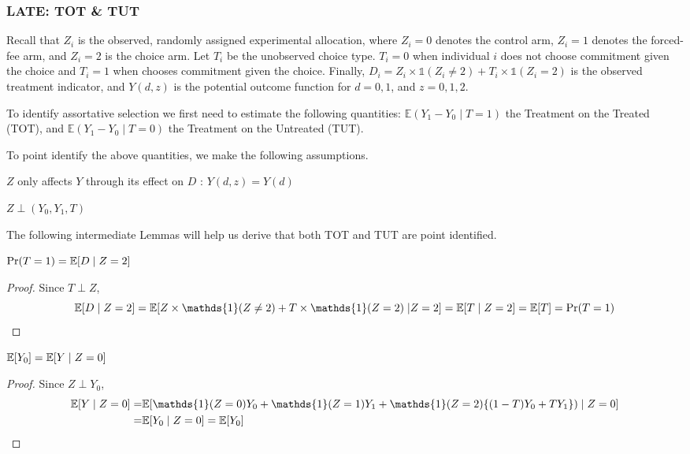 \documentclass[oneside,11pt]{article}
\begin{document}
\subsubsection{LATE: TOT \& TUT}
\vspace{.2in}
\normalsize
\linespread{1.25}


 Recall that $Z_i$ is the observed, randomly assigned experimental allocation, where $Z_i=0$ denotes the control arm, $Z_i=1$ denotes the forced-fee arm, and $Z_i=2$ is the choice arm.  Let $T_i$ be the unobserved choice type. $T_i=0$ when individual $i$ does not choose commitment  given the choice and $T_i=1$ when chooses commitment given the choice. Finally, $D_i = Z_i\times \mathds{1}(Z_i\neq 2) + T_i\times \mathds{1}(Z_i=2)$ is the observed treatment indicator, and $Y(d,z)$ is the potential outcome function for $d=0,1$, and $z=0,1,2$. 

 To identify assortative selection we first need to estimate the following quantities: $\mathbb{E}(Y_1-Y_0\;|\;T=1)$ the Treatment on the Treated (TOT), and $\mathbb{E}(Y_1-Y_0\;|\;T=0)$ the Treatment on the Untreated (TUT). 

 To point identify the above quantities, we make the following assumptions.

 \begin{assumption}
$Z$ only affects $Y$ through its effect on $D$ : $Y(d,z) = Y(d)$
 \end{assumption}

  \begin{assumption}
$Z \perp (Y_0, Y_1, T)$
 \end{assumption}

The following intermediate Lemmas will help us derive that both TOT and TUT are point identified.

\begin{lem}
$\Pr(T=1) = \mathbb{E}[D\;|\;Z=2]$
\end{lem}
\begin{proof}
Since $T\perp Z$, 
$$\E[D\;|\;Z=2] = \E[Z\times \mathds{1}(Z\neq 2)+ T\times\mathds{1}(Z=2)\;|Z=2] = \E[T\;|\;Z=2] = \E[T] = \Pr(T=1)$$
\end{proof}


\begin{lem}
$\mathbb{E}[Y_0] = \mathbb{E}[Y\;|\;Z=0]$
\end{lem}
\begin{proof}
Since $Z\perp Y_0$, 
\begin{align*}
\E[Y\;|\;Z=0] =& \E[\mathds{1}(Z=0)Y_0+\mathds{1}(Z=1)Y_1+\mathds{1}(Z=2)\{(1-T)Y_0+TY_1\})\;|\;Z=0]\\   
=&\E[Y_0\;|\;Z=0] = \E[Y_0]
\end{align*}
\end{proof}
\end{document}
